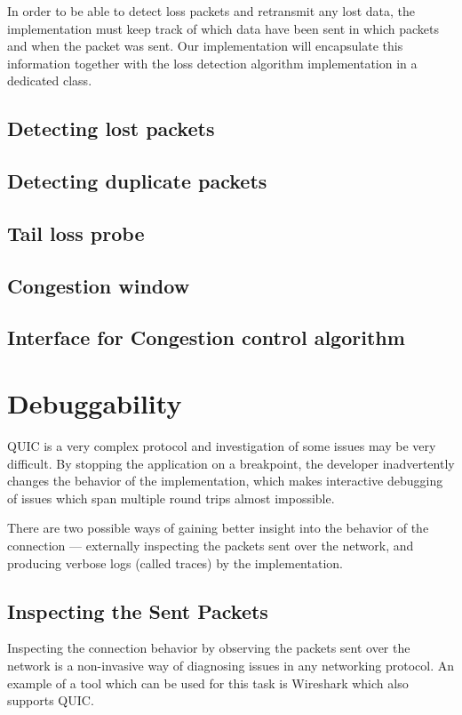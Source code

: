 
In order to be able to detect loss packets and retransmit any lost data, the \QuicConnection{}
implementation must keep track of which data have been sent in which packets and when the packet was
sent. Our implementation will encapsulate this information together with the loss detection
algorithm implementation in a dedicated \RecoveryController{} class.

\subsection{Detecting lost packets}
\subsection{Detecting duplicate packets}
\subsection{Tail loss probe}
\subsection{Congestion window}
\subsection{Interface for Congestion control algorithm}

\section{Debuggability}

QUIC is a very complex protocol and investigation of some issues may be very difficult. By stopping
the application on a breakpoint, the developer inadvertently changes the behavior of the
implementation, which makes interactive debugging of issues which span multiple round trips almost
impossible.

There are two possible ways of gaining better insight into the behavior of the connection ---
externally inspecting the packets sent over the network, and producing verbose logs (called traces)
by the implementation.

\subsection{Inspecting the Sent Packets}

Inspecting the connection behavior by observing the packets sent over the network is a non-invasive
way of diagnosing issues in any networking protocol. An example of a tool which can be used for this
task is Wireshark \cite{web:wireshark} which also supports QUIC.

